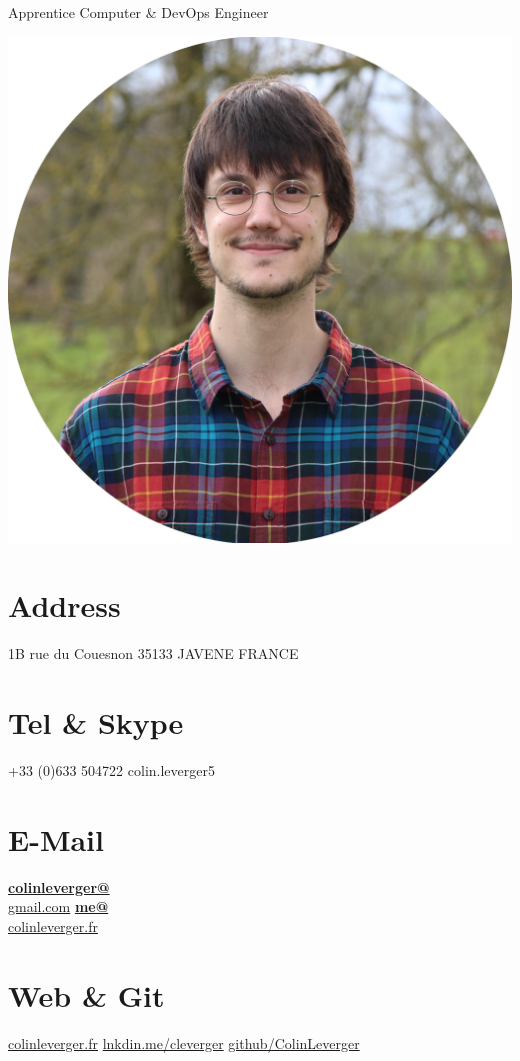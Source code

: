 \documentclass[]{friggeri-cv}
\begin{document}
      {Apprentice Computer \& DevOps Engineer}


\begin{aside}
  \includegraphics[scale=0.035]{img/rounded.png}
  \section{Address}
    1B rue du Couesnon
    35133 JAVENE
    FRANCE
    ~
  \section{Tel \& Skype}
    +33 (0)633 504722
    colin.leverger5
    ~
  \section{E-Mail}
    \href{mailto:colinleverger@gmail.com}{\textbf{colinleverger@}\\gmail.com}
    \href{mailto:me@colinleverger.fr}{\textbf{me@}\\colinleverger.fr}
    ~
  \section{Web \& Git}
    \href{http://www.colinleverger.fr}{colinleverger.fr}
    \href{https://www.linkedin.com/in/colinleverger}{lnkdin.me/cleverger}
    \href{https://github.com/ColinLeverger}{github/ColinLeverger}
    ~

\end{aside}
\end{document}
